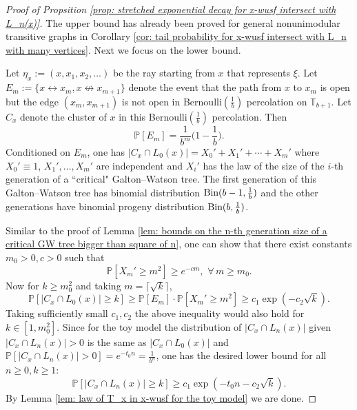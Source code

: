 \documentclass[12pt]{article}
\numberwithin{equation}{section}
\newcommand{\1}{\mathbf{1}}
\begin{document}
\begin{proof}[Proof of Propsition \ref{prop: stretched exponential decay for x-wusf intersect with L_n(x)}]
The upper bound has already been proved for general nonunimodular transitive graphs in Corollary \ref{cor: tail probability for x-wusf intersect with L_n with many vertices}. Next we focus on the lower bound.  
	
		Let $\eta_x:=(x,x_1,x_2,\ldots)$ be the ray starting from $x$ that represents $\xi$. Let $E_m:=\{ x\leftrightarrow x_m, x\not\leftrightarrow x_{m+1}\}$ denote the event that the path from $x$ to $x_m$ is open but the edge $(x_{m},x_{m+1})$ is not open in Bernoulli$(\frac{1}{b})$ percolation on $\mathbb{T}_{b+1}$. Let $C_x$ denote the cluster of $x$ in this Bernoulli$(\frac{1}{b})$ percolation. 
	Then 
	\[
	\mathbb{P}[E_m]=\frac{1}{b^m}\big(1-\frac{1}{b}\big).
	\]
	Conditioned on $E_m$, one has $|C_x\cap L_0(x)|=X_0'+X_1'+\cdots+X_m'$ where $X_0'\equiv1$, $X_1',\ldots, X_m'$ are independent and $X_i'$ has the law of the size of the $i$-th generation of a ``critical" Galton--Watson tree. The first generation of this Galton--Watson tree has binomial distribution $\textnormal{Bin}(b-1,\frac{1}{b})$ and the other generations have binomial progeny distribution $\textnormal{Bin}(b,\frac{1}{b})$. 
	
	Similar to the proof of Lemma \ref{lem: bounds on the n-th generation size of a critical GW tree bigger than square of n}, one can show that  there exist constants $m_0>0,c>0$ such that  
	\[
	\mathbb{P}[X_m'\geq m^2]\geq e^{-cm},\,\,\forall \, m\geq m_0.
	\]
	Now for $k\geq m_0^2$ and taking $m=\lceil \sqrt{k}\rceil$,
\[
\mathbb{P}[|C_x\cap L_0(x)|\geq k]\geq \mathbb{P}[E_m]\cdot \mathbb{P}[X_m'\geq m^2]\geq 
c_1\exp(-c_2\sqrt{k}).
\]
Taking sufficiently small $c_1,c_2$ the above inequality would also hold for $k\in[1,m_0^2]$. 
Since for the toy model the distribution of $|C_x\cap L_n(x)|$ given $|C_x\cap L_n(x)|>0$ is the same as $|C_x\cap L_0(x)|$ and $\mathbb{P}[|C_x\cap L_n(x)|>0]=e^{-t_0n}=\frac{1}{b^n}$, one has the desired lower bound for all $n\geq0,k\geq 1$:
\[
\mathbb{P}[|C_x\cap L_n(x)|\geq k]\geq 
c_1\exp(-t_0n-c_2\sqrt{k}).
\] 
By Lemma \ref{lem: law of T_x in  x-wusf for the toy model} we are done.	
\end{proof}
\end{document}
